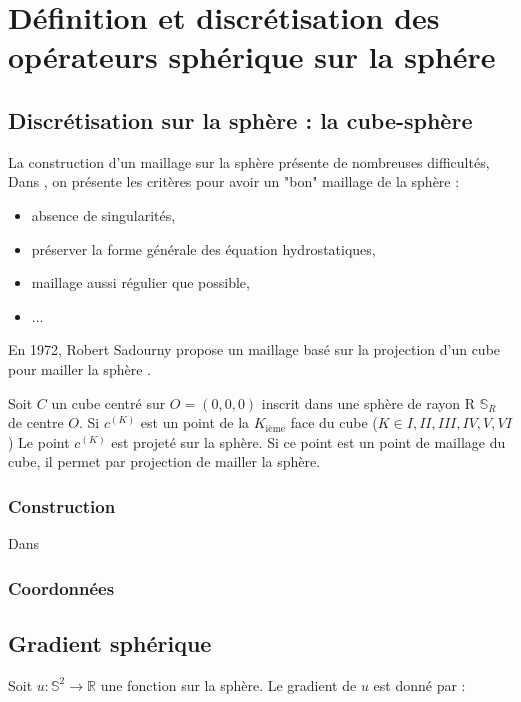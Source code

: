 
\chapter{Définition et discrétisation des opérateurs sphérique sur la sphére}

\section{Discrétisation sur la sphère : la cube-sphère}

La construction d'un maillage sur la sphère présente de nombreuses difficultés, Dans \cite{Ronchi1996}, on présente les critères pour avoir un "bon" maillage de la sphère :

\begin{itemize}
\item absence de singularités,
\item préserver la forme générale des équation hydrostatiques,
\item maillage aussi régulier que possible,
\item ...
\end{itemize}

En 1972, Robert Sadourny propose un maillage basé sur la projection d'un cube pour mailler la sphère \cite{Sadourny1972}.

Soit $C$ un cube centré sur $O=(0,0,0)$ inscrit dans une sphère de rayon R $\mathbb{S}_R$ de centre $O$.
Si $c^{(K)}$ est un point de la $K_{\text{ième}}$ face du cube ($K \in I, II, III, IV, V, VI$) 
Le point $c^{(K)}$ est projeté sur la sphère. Si ce point est un point de maillage du cube, il permet par projection de mailler la sphère. 

\subsection{Construction}

Dans 

\subsection{Coordonnées}

\section{Gradient sphérique}

Soit $u : \mathbb{S}^2 \longrightarrow \mathbb{R}$ une fonction sur la sphère. Le gradient de $u$ est donné par :

